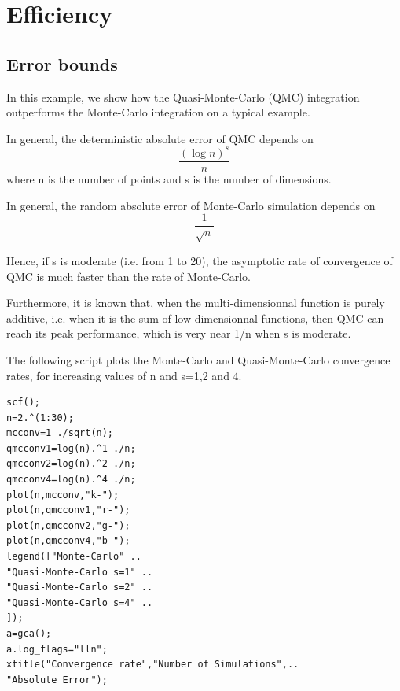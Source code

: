 %

\chapter{Efficiency}


\section{Error bounds}

	
	In this example, we show how the Quasi-Monte-Carlo (QMC) 
	integration outperforms the Monte-Carlo integration on a 
	typical example. 
	

	
	In general, the deterministic absolute error of QMC depends on 
$$
	\frac{(\log n)^s}{n}
$$
	where n is the number of points and s is the number 
	of dimensions.
	

	
	In general, the random absolute error of Monte-Carlo simulation 
	depends on 
$$
	\frac{1}{\sqrt{n}}
$$
	

	
	Hence, if s is moderate (i.e. from 1 to 20), the asymptotic 
	rate of convergence of QMC is much faster than the rate of Monte-Carlo. 
	

	
	Furthermore, it is known that, when the multi-dimensionnal function is purely additive, 
	i.e. when it is the sum of low-dimensionnal functions, 
	then QMC can reach its peak performance, which is very near 1/n 
	when s is moderate.
	
	
	
	The following script plots the Monte-Carlo and Quasi-Monte-Carlo convergence 
	rates, for increasing values of n and s=1,2 and 4. 
	
	
\lstset{language=scilabscript}
\begin{lstlisting}
scf();
n=2.^(1:30);
mcconv=1 ./sqrt(n);
qmcconv1=log(n).^1 ./n;
qmcconv2=log(n).^2 ./n;
qmcconv4=log(n).^4 ./n;
plot(n,mcconv,"k-");
plot(n,qmcconv1,"r-");
plot(n,qmcconv2,"g-");
plot(n,qmcconv4,"b-");
legend(["Monte-Carlo" ..
"Quasi-Monte-Carlo s=1" ..
"Quasi-Monte-Carlo s=2" ..
"Quasi-Monte-Carlo s=4" ..
]);
a=gca();
a.log_flags="lln";
xtitle("Convergence rate","Number of Simulations",..
"Absolute Error");
\end{lstlisting}

